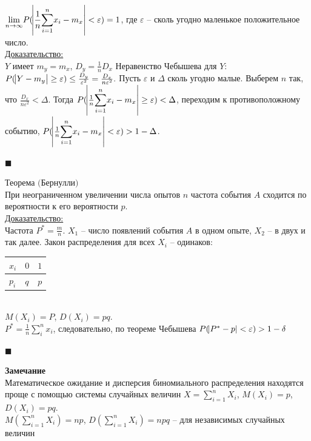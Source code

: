 \documentclass[russian, 12pt, fleqn]{article}
\begin{document}
$\displaystyle{  \lim_{n\to{\infty}}  } P(\abs{\frac{1}{n}  \displaystyle{\sum\limits_{i = 1}^{n}} x_i - m_x} < \varepsilon) = 1$, где $ \varepsilon$ --  сколь угодно маленькое положительное число.\\
\underline{Доказательство:}\\
$Y$ имеет $m_y=m_x$, $D_y = \frac{1}{n}D_x$ Неравенство Чебышева для $Y$:\\ $P(\abs{Y-m_y} \geq \varepsilon) \leq \frac{D_y}{\varepsilon^2} = \frac{D_x}{n\varepsilon^2}.$
Пусть $\varepsilon$ и $\Delta$ сколь угодно малые. Выберем $n$ так, что $\frac{D_x}{n\varepsilon^2} < \Delta$. Тогда $P(\abs{\frac{1}{n}  \displaystyle{\sum\limits_{i = 1}^{n}} x_i - m_x} \geq \varepsilon) < \Delta$, переходим к противоположному событию,  $P(\abs{\frac{1}{n}  \displaystyle{\sum\limits_{i = 1}^{n}} x_i - m_x} < \varepsilon) > 1 - \Delta$.\\
\begin{flushright}\(\blacksquare\)\end{flushright}
$\textbf{Теорема (Бернулли)}$\\
При неограниченном увеличении числа опытов $n$ частота события $A$ сходится по вероятности к его вероятности $p$.\\
\underline{Доказательство:}\\
Частота $P^* = \frac{m}{n}$. $X_1$ -- число появлений события $A$ в одном опыте, $X_2$ --  в двух и так далее. Закон распределения для всех $X_i$ -- одинаков:\\
\begin{tabular}[b]{ | l | l |  l |  }
\hline
$ x_i$ & $0$ & $1$   \\
\hline
  $p_i$   & $q$  & $p$   \\
\hline
\end{tabular}\\
$M(X_i) = P$, $D(X_i) = pq$.\\
$P^* = \frac{1}{n} \displaystyle{\sum_{i}^{n}} x_i$,  следовательно, по теореме Чебышева $P(\abs{P^* - p} < \varepsilon) > 1 - \delta$\\
\begin{flushright}\(\blacksquare\)\end{flushright}
\textbf{Замечание\ } \\
Математическое ожидание и дисперсия биномиального распределения находятся проще с помощью системы случайных величин $X = \displaystyle{\sum\limits_{i = 1}^{n}} X_i$, 
$M(X_i) = p$, $D(X_i) = pq$.\\
$M(\displaystyle{\sum\limits_{i = 1}^{n}} X_i) = np$, $D(\displaystyle{\sum\limits_{i = 1}^{n}} X_i) = npq$ -- для независимых случайных величин\\
\end{document}
